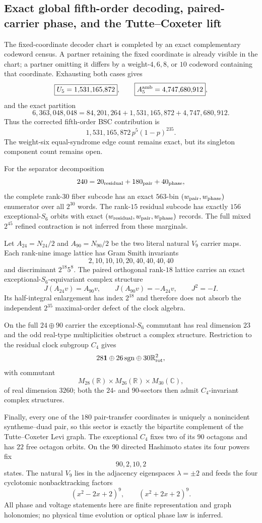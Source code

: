 \subsection{Exact global fifth-order decoding, paired-carrier phase, and the Tutte--Coxeter lift}
\label{subsec:bt1887-1891-five-frontiers}
The fixed-coordinate decoder chart is completed by an exact complementary
codeword census.  A partner retaining the fixed coordinate is already visible
in the chart; a partner omitting it differs by a weight-$4,6,8$, or $10$
codeword containing that coordinate.  Exhausting both cases gives
\[
 \boxed{U_5=1{,}531{,}165{,}872},
 \qquad
 \boxed{A^{\rm amb}_5=4{,}747{,}680{,}912},
\]
and the exact partition
\[
 6{,}363{,}048{,}048
 =84{,}201{,}264+1{,}531{,}165{,}872+4{,}747{,}680{,}912.
\]
Thus the corrected fifth-order BSC contribution is
\[
 \boxed{1{,}531{,}165{,}872\,p^5(1-p)^{235}}.
\]
The weight-six equal-syndrome edge count remains exact, but its singleton
component count remains open.

For the separator decomposition
\[
 240=20_{\rm residual}+180_{\rm pair}+40_{\rm phase},
\]
the complete rank-$30$ fiber subcode has an exact $563$-bin
$(w_{\rm pair},w_{\rm phase})$ enumerator over all $2^{30}$ words.  The
rank-$15$ residual subcode has exactly $156$ exceptional-$S_6$ orbits with
exact $(w_{\rm residual},w_{\rm pair},w_{\rm phase})$ records.  The full mixed
$2^{45}$ refined contraction is not inferred from these marginals.

Let $A_{24}=N_{24}/2$ and $A_{90}=N_{90}/2$ be the two literal natural
$V_9$ carrier maps.  Each rank-nine image lattice has Gram Smith invariants
\[
 2,10,10,10,20,40,40,40,40
\]
and discriminant $2^{18}5^8$.  The paired orthogonal rank-$18$ lattice carries
an exact exceptional-$S_6$-equivariant complex structure
\[
 J(A_{24}v)=A_{90}v,
 \qquad J(A_{90}v)=-A_{24}v,
 \qquad J^2=-I.
\]
Its half-integral enlargement has index $2^{18}$ and therefore does not absorb
the independent $2^{35}$ maximal-order defect of the clock algebra.

On the full $24\oplus90$ carrier the exceptional-$S_6$ commutant has real
dimension $23$ and the odd real-type multiplicities obstruct a complex
structure.  Restriction to the residual clock subgroup $C_4$ gives
\[
 28\mathbf1\oplus26\,\mathrm{sgn}\oplus30\mathbb R^2_{\rm rot},
\]
with commutant
\[
 M_{28}(\mathbb R)\times M_{26}(\mathbb R)\times M_{30}(\mathbb C),
\]
of real dimension $3260$; both the $24$- and $90$-sectors then admit
$C_4$-invariant complex structures.

Finally, every one of the $180$ pair-transfer coordinates is uniquely a
nonincident syntheme--duad pair, so this sector is exactly the bipartite
complement of the Tutte--Coxeter Levi graph.  The exceptional $C_4$ fixes two
of its $90$ octagons and has $22$ free octagon orbits.  On the $90$ directed
Hashimoto states its four powers fix
\[
 90,2,10,2
\]
states.  The natural $V_9$ lies in the adjacency eigenspaces $\lambda=\pm2$
and feeds the four cyclotomic nonbacktracking factors
\[
 (x^2-2x+2)^9,
 \qquad
 (x^2+2x+2)^9.
\]
All phase and voltage statements here are finite representation and graph
holonomies; no physical time evolution or optical phase law is inferred.
